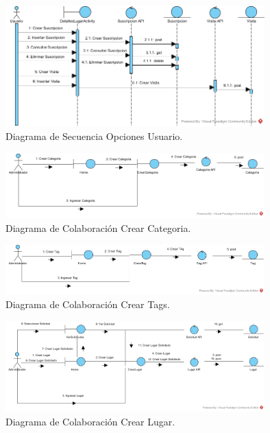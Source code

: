 \documentclass[12pt,letterpaper,openany]{book}
\begin{document}
\begin{figure}[H]
\begin{center}
\includegraphics[width=10cm]{./imagenes/DS/DS_opciones_usuario}
\caption{Diagrama de Secuencia Opciones Usuario.}
\end{center}
\end{figure}

\begin{figure}[H]
\begin{center}
\includegraphics[width=10cm]{./imagenes/DC/DC_crear_categoria}
\caption{Diagrama de Colaboración Crear Categoria.}
\end{center}
\end{figure}

\begin{figure}[H]
\begin{center}
\includegraphics[width=10cm]{./imagenes/DC/DC_crear_tag}
\caption{Diagrama de Colaboración Crear Tags.}
\end{center}
\end{figure}

\begin{figure}[H]
\begin{center}
\includegraphics[width=10cm]{./imagenes/DC/DC_crear_lugar}
\caption{Diagrama de Colaboración Crear Lugar.}
\end{center}
\end{figure}
\end{document}
